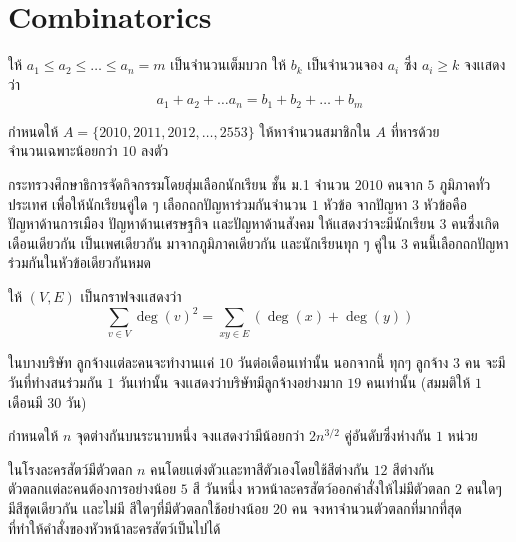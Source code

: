 \documentclass[a4paper,12pt]{scrartcl}
\begin{document}
\section{Combinatorics}
\begin{example}
	ให้ $a_1 \le a_2 \le \dots \le a_n = m$ เป็นจำนวนเต็มบวก ให้ $b_k$ เป็นจำนวนจอง $a_i$ ซึ่ง $a_i \ge k $ จงเเสดงว่า \[ a_1+a_2+\dots a_n = b_1+b_2+\dots +b_m \]
\end{example}
\begin{example}
	กำหนดให้ $A =\{ 2010,2011,2012,\dots ,2553 \} $ ให้หาจำนวนสมาชิกใน $A$ ที่หารด้วย \\ จำนวนเฉพาะน้อยกว่า $10$ ลงตัว 
\end{example}
\begin{example}
	กระทรวงศึกษาธิการจัดกิจกรรมโดยสุ่มเลือกนักเรียน ชั้น ม.1 จำนวน $2010$ คนจาก $5$ ภูมิภาคทั่ว\\ ประเทศ เพื่อให้นักเรียนคู่ใด ๆ เลือกถกปัญหาร่วมกันจำนวน $1$ หัวข้อ จากปัญหา $3$ หัวข้อคือ\\ ปัญหาด้านการเมือง ปัญหาด้านเศรษฐกิจ เเละปัญหาด้านสังคม ให้เเสดงว่าจะมีนักเรียน $3$ คนซึ่งเกิด\\เดือนเดียวกัน เป็นเพศเดียวกัน มาจากภูมิภาคเดียวกัน เเละนักเรียนทุก ๆ คู่ใน $3$ คนนี้เลือกถกปัญหา \\ ร่วมกันในหัวข้อเดียวกันหมด
\end{example}
	\begin{example}
		ให้ $(V,E)$ เป็นกราฟจงเเสดงว่า \[
			\sum_{v\in V} \deg(v)^2 = \sum_{xy \in E}(\deg(x)+\deg(y))
		\]
	\end{example}
	\begin{example}
		ในบางบริษัท ลูกจ้างเเต่ละคนจะทำงานเเค่ $10$ วันต่อเดือนเท่านั้น นอกจากนี้ ทุกๆ ลูกจ้าง $3$ คน จะมีวันที่ทำงสนร่วมกัน $1$ วันเท่านั้น จงเเสดงว่าบริษัทมีลูกจ้างอย่างมาก $19$ คนเท่านั้น (สมมติให้ $1$ เดือนมี $30$ วัน)
	\end{example}
	\begin{example}
		กำหนดให้ $n$ จุดต่างกันบนระนาบหนึ่ง จงเเสดงว่ามีน้อยกว่า $2n^{3/2}$ คู่อันดับซึ่งห่างกัน $1$ หน่วย
	\end{example}
	\begin{example}
		ในโรงละครสัตว์มีตัวตลก $n$ คนโดยเเต่งตัวเเละทาสีตัวเองโดยใช้สีต่างกัน $12$ สีต่างกัน \\ ตัวตลกเเต่ละคนต้องการอย่างน้อย $5$ สี วันหนึ่ง หวหน้าละครสัตว์ออกคำสั่งให้ไม่มีตัวตลก $2$ คนใดๆ มีสีชุดเดียวกัน เเละไม่มี สีใดๆที่มีตัวตลกใช้อย่างน้อย $20$ คน จงหาจำนวนตัวตลกที่มากที่สุด\\ที่ทำให้คำสั่งของหัวหน้าละครสัตว์เป็นไปได้
	\end{example}
\end{document}
